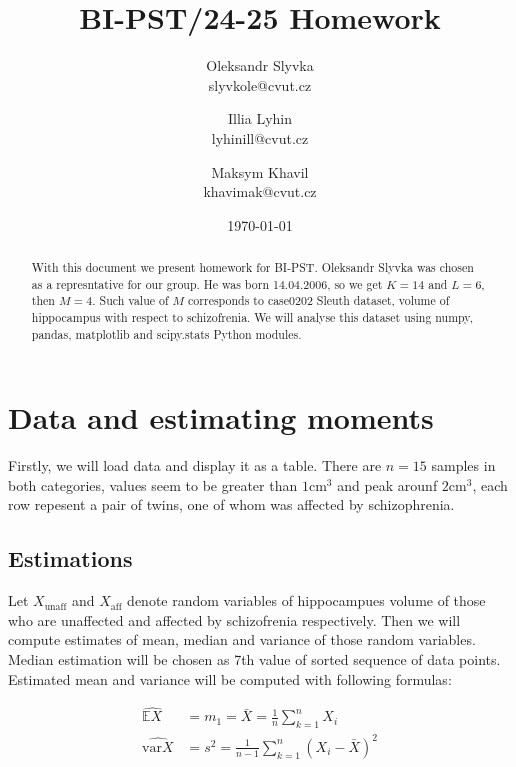 \documentclass[12pt,a4paper]{article} %
\title{BI-PST/24-25 Homework}
\author{Oleksandr Slyvka\\ slyvkole@cvut.cz  \and Illia Lyhin  \\ lyhinill@cvut.cz \and Maksym Khavil \\ khavimak@cvut.cz }
\date{\today} %
\newcommand{\randv}[2][X]{#1_{\text{#2}}}
\newcommand{\E}{\mathbb{E}}
\newcommand{\var}{\text{var}}
\begin{document}
\maketitle
\begin{abstract}
With this document we present homework for BI-PST. Oleksandr Slyvka was chosen as a represntative for our group. He was born 14.04.2006, so we get $K=14$ and $L=6$, then $M = 4$. Such value of $M$ corresponds to case0202 Sleuth dataset, volume of hippocampus with respect to schizofrenia. We will analyse this dataset using numpy, pandas, matplotlib and scipy.stats Python modules.
\end{abstract}
\vspace{1em}

\section{Data and estimating moments}

\begin{multicols}{2}

  Firstly, we will load data and display it as a table. There are $n=15$ samples in both categories, values seem to be greater than $1 \text{cm}^3$ and peak arounf $2 \text{cm}^3$, each row repesent a pair of twins, one of whom was affected by schizophrenia.
\columnbreak

\datatable


\end{multicols}
\pagebreak

\subsection{Estimations}
  Let $\randv{unaff}$ and $\randv{aff}$ denote random variables of hippocampues volume of those who are unaffected and affected by schizofrenia respectively. Then we will compute estimates of mean, median and variance of those random variables. Median estimation will be chosen as 7th value of sorted sequence of data points. Estimated mean and variance will be computed with following formulas:

\begin{align*}
  \widehat{\E\randv{}} &= m_1 = \bar{X} = \frac{1}{n} \sum_{k = 1}^{n}X_i\\
  \widehat{\var\randv{}} &= s^2 = \frac{1}{n - 1} \sum_{k = 1}^n(X_i - \bar{X})^2
\end{align*}
\end{document}
